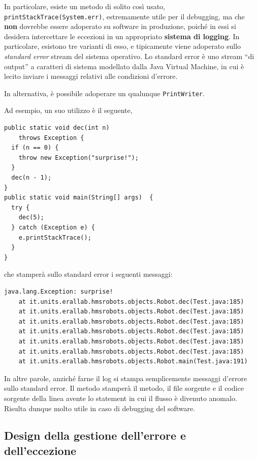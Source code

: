 \documentclass[\fontsizeclass,twocolumn]{\classname}
\theoremstyle{definition}
\theoremstyle{definition}
\begin{document}
In particolare, esiste un metodo di solito così usato,
\texttt{printStackTrace(System.err)}, estremamente utile per il debugging, ma
che \textbf{non} dovrebbe essere adoperato su software in produzione, poiché in
essi si desidera intercettare le eccezioni in un appropriato \textbf{sistema di
logging}. In particolare, esistono tre varianti di esso, e tipicamente viene
adoperato sullo \emph{standard error} stream del sistema operativo. Lo standard
error è uno stream ``di output'' a caratteri di sistema modellato dalla Java
Virtual Machine, in cui è lecito inviare i messaggi relativi alle condizioni
d'errore.

In alternativa, è possibile adoperare un qualunque \texttt{PrintWriter}.

Ad esempio, un suo utilizzo è il seguente,

\begin{lstlisting}
public static void dec(int n)
    throws Exception {
  if (n == 0) {
    throw new Exception("surprise!");
  }
  dec(n - 1);
}
public static void main(String[] args)  {
  try {
    dec(5);
  } catch (Exception e) {
    e.printStackTrace();
  }
}
\end{lstlisting}

che stamperà sullo standard error i seguenti messaggi:

\begin{verbatim}
java.lang.Exception: surprise!
    at it.units.erallab.hmsrobots.objects.Robot.dec(Test.java:185)
    at it.units.erallab.hmsrobots.objects.Robot.dec(Test.java:185)
    at it.units.erallab.hmsrobots.objects.Robot.dec(Test.java:185)
    at it.units.erallab.hmsrobots.objects.Robot.dec(Test.java:185)
    at it.units.erallab.hmsrobots.objects.Robot.dec(Test.java:185)
    at it.units.erallab.hmsrobots.objects.Robot.dec(Test.java:185)
    at it.units.erallab.hmsrobots.objects.Robot.main(Test.java:191)
\end{verbatim}

In altre parole, anziché farne il log si stampa semplicemente messaggi d'errore
sullo standard error. Il metodo stamperà il metodo, il file sorgente e il
codice sorgente della linea avente lo statement in cui il flusso è divenuto
anomalo. Risulta dunque molto utile in caso di debugging del software.

\subsection{Design della gestione dell'errore e dell'eccezione}
\end{document}
